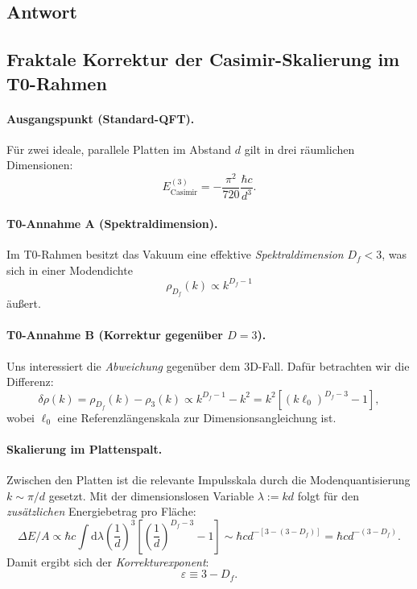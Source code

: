 \documentclass[12pt,a4paper]{article}
\theoremstyle{remark}
\newenvironment{answer}{\subsection*{Antwort}}{\vspace{1em}}
\begin{document}
\begin{answer}
	\subsection{Fraktale Korrektur der Casimir-Skalierung im T0-Rahmen}
	
	\paragraph{Ausgangspunkt (Standard-QFT).}
	Für zwei ideale, parallele Platten im Abstand \( d \) gilt in drei räumlichen Dimensionen:
	\begin{equation}
		E_{\text{Casimir}}^{(3)} = -\frac{\pi^2}{720} \frac{\hbar c}{d^3}.
	\end{equation}
	
	\paragraph{T0-Annahme A (Spektraldimension).}
	Im T0-Rahmen besitzt das Vakuum eine effektive \emph{Spektraldimension} \( D_f < 3 \), was sich in einer Modendichte
	\begin{equation}
		\rho_{D_f}(k) \propto k^{D_f - 1}
	\end{equation}
	äußert.
	
	\paragraph{T0-Annahme B (Korrektur gegenüber \( D=3 \)).}
	Uns interessiert die \emph{Abweichung} gegenüber dem 3D-Fall. Dafür betrachten wir die Differenz:
	\begin{equation}
		\delta \rho(k) = \rho_{D_f}(k) - \rho_3(k) \propto k^{D_f - 1} - k^2 = k^2 \left[ \left( k \ell_0 \right)^{D_f - 3} - 1 \right],
	\end{equation}
	wobei \( \ell_0 \) eine Referenzlängenskala zur Dimensionsangleichung ist.
	
	\paragraph{Skalierung im Plattenspalt.}
	Zwischen den Platten ist die relevante Impulsskala durch die Modenquantisierung \( k \sim \pi / d \) gesetzt. Mit der dimensionslosen Variable \( \lambda := k d \) folgt für den \emph{zusätzlichen} Energiebetrag pro Fläche:
	\begin{equation}
		\Delta E / A \propto \hbar c \int \mathrm{d} \lambda \left( \frac{1}{d} \right)^3 \left[ \left( \frac{1}{d} \right)^{D_f - 3} - 1 \right] \sim \hbar c d^{- [3 - (3 - D_f)]} = \hbar c d^{- (3 - D_f)}.
	\end{equation}
	Damit ergibt sich der \emph{Korrekturexponent}:
	\begin{equation}
		\varepsilon \equiv 3 - D_f.
	\end{equation}
	

\end{answer}
\end{document}
